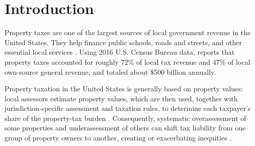 \documentclass[10pt]{article}
\theoremstyle{definition}
\newcommand{\1}{\mathbf{1}}
\newcommand{\oldtext}[1]{\textcolor{blue}{\sout{#1}}}
\newcommand{\newtext}[1]{\textcolor{impGreen}{#1}}
\begin{document}
\begin{abstract}
\newtext{Across substantial portions of the Direct and Surrogate paths, increasing regularization attenuates the targeted first-order pattern and moves several assessor-facing vertical-equity diagnostics toward neutrality, while stronger regularization exposes tradeoffs in predictive performance and ratio shape. Near-neutral first-order or grouped diagnostics do not imply a flat value-related profile, and broader residual--price dependence can remain.}
\newtext{A fixed-prediction-space analysis clarifies that the two objectives are related but not equivalent: the Direct penalty follows a rank-one covariance-correction path, whereas the Surrogate is a log-price-distance-weighted projection that can combine multiple learnable correction directions. Exploratory multi-jurisdiction analyses separately examine transferability and heterogeneity. We report complete regularization paths and do not select a deployment penalty strength.}

\end{abstract}



\section{Introduction}
\label{sec:introduction}

Property taxes are one of the largest sources of local government revenue in the United States. They help finance public schools, roads and streets, and other essential local services \cite{IAAO2020PropertyTaxPolicy}. Using 2016 U.S. Census Bureau data, \textcite{Berry2021} reports that property taxes accounted for roughly 72\% of local tax revenue and 47\% of local own-source general revenue, and totaled about \$500 billion annually.

{Property taxation in the United States is generally based on property values}: local assessors estimate property values, which are then used, together with jurisdiction-specific assessment and taxation rules, to determine each taxpayer's share of the property-tax burden \cite{IAAO2020PropertyTaxPolicy,IAAO2025Mass}. Consequently, systematic overassessment of some properties and underassessment of others can shift tax liability from one group of property owners to another, creating or exacerbating inequities \cite{Berry2021,IAAO2020PropertyTaxPolicy}.
\end{document}
